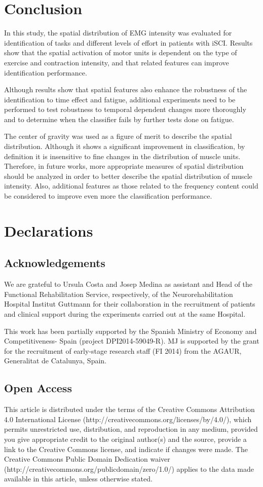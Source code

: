 \section{Conclusion}
In this study, the spatial distribution of EMG intensity was evaluated for identification of tasks and different levels of effort in patients with iSCI. Results show that the spatial activation of motor units is dependent on the type of exercise and contraction intensity, and that related features can improve identification performance.

Although results show that spatial features also enhance the robustness of the identification to time effect and fatigue, additional experiments need to be performed to test robustness to temporal dependent changes more thoroughly and to determine when the classifier fails by further tests done on fatigue.

The center of gravity was used as a figure of merit to describe the spatial distribution. Although it shows a significant improvement in classification, by definition it is insensitive to fine changes in the distribution of muscle units. Therefore, in future works, more appropriate measures of spatial distribution should be analyzed in order to better describe the spatial distribution of muscle intensity. Also, additional features as those related to the frequency content could be considered to improve even more the classification performance.




\section{Declarations} 
\subsection{Acknowledgements}
We are grateful to Ursula Costa and Josep Medina as assistant and Head of the Functional Rehabilitation Service, respectively, of the Neurorehabilitation Hospital Institut Guttmann for their collaboration in the recruitment of patients and clinical support during the experiments carried out at the same Hospital.

This work has been partially supported by the Spanish Ministry of Economy and Competitiveness- Spain (project DPI2014-59049-R). MJ is supported by the grant for the recruitment of early-stage research staff (FI 2014) from the AGAUR, Generalitat de Catalunya, Spain.

\subsection{Open Access}
This article is distributed under the terms of the Creative Commons Attribution 4.0 International License (http://creativecommons.org/licenses/by/4.0/), which permits unrestricted use, distribution, and reproduction in any medium, provided you give appropriate credit to the original author(s) and the source, provide a link to the Creative Commons license, and indicate if changes were made. The Creative Commons Public Domain Dedication waiver (http://creativecommons.org/publicdomain/zero/1.0/) applies to the data made available in this article, unless otherwise stated.

